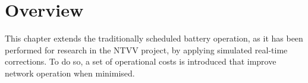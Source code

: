 \section{Overview}
\label{ch1:sec:overview}

This chapter extends the traditionally scheduled battery operation, as it has been performed for research in the NTVV project, by applying simulated real-time corrections. To do so, a set of operational costs is introduced that improve network operation when minimised.